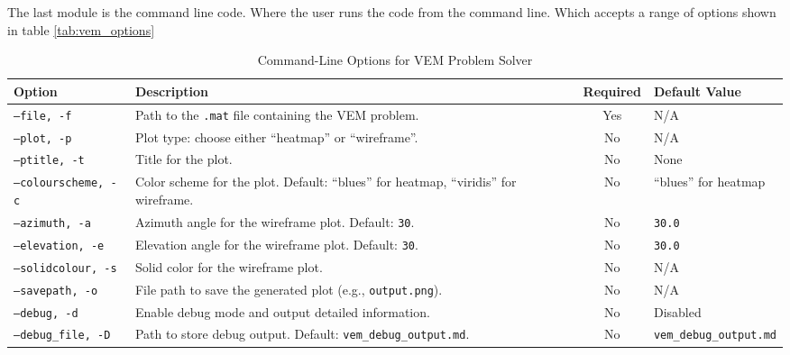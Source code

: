 \documentclass{report}
\begin{document}
The last module is the command line code. Where the user runs the code from the command line. Which accepts a range of options shown in table \eqref{tab:vem_options}

\begin{table}[ht]
    \centering
    \caption{Command-Line Options for VEM Problem Solver}
    \label{tab:vem_options}
    \renewcommand{\arraystretch}{1.5}
    \begin{tabularx}{\textwidth}{|l|X|c|X|}
        \hline
        \textbf{Option} & \textbf{Description} & \textbf{Required} & \textbf{Default Value} \\
        \hline
        \texttt{--file, -f}         & Path to the \texttt{.mat} file containing the VEM problem. & Yes & N/A \\
        \texttt{--plot, -p}         & Plot type: choose either ``heatmap'' or ``wireframe''. & No & N/A \\
        \texttt{--ptitle, -t}       & Title for the plot. & No & None \\
        \texttt{--colourscheme, -c} & Color scheme for the plot. Default: ``blues'' for heatmap, ``viridis'' for wireframe. & No & ``blues'' for heatmap \\
        \texttt{--azimuth, -a}      & Azimuth angle for the wireframe plot. Default: \texttt{30}. & No & \texttt{30.0} \\
        \texttt{--elevation, -e}    & Elevation angle for the wireframe plot. Default: \texttt{30}. & No & \texttt{30.0} \\
        \texttt{--solidcolour, -s}  & Solid color for the wireframe plot. & No & N/A \\
        \texttt{--savepath, -o}     & File path to save the generated plot (e.g., \texttt{output.png}). & No & N/A \\
        \texttt{--debug, -d}        & Enable debug mode and output detailed information. & No & Disabled \\
        \texttt{--debug\_file, -D}  & Path to store debug output. Default: \texttt{vem\_debug\_output.md}. & No & \texttt{vem\_debug\_output.md} \\
        \hline
    \end{tabularx}
\end{table}
\end{document}

